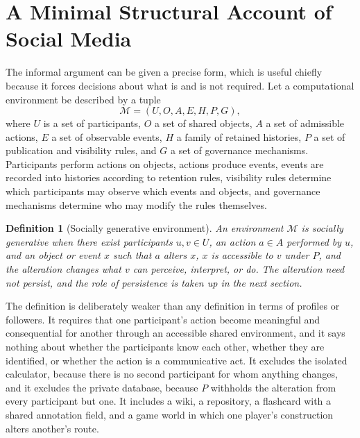 \documentclass[11pt]{article}
\newtheorem{definition}{Definition}
\theoremstyle{remark}
\newcommand{\U}{U}
\newcommand{\Oo}{O}
\newcommand{\A}{A}
\newcommand{\E}{E}
\newcommand{\Hh}{H}
\newcommand{\Pp}{P}
\newcommand{\Gg}{G}
\begin{document}
\section{A Minimal Structural Account of Social Media}
\label{sec:structure}

The informal argument can be given a precise form, which is useful chiefly because it forces decisions about what is and is not required. Let a computational environment be described by a tuple
\[
\mathcal{M}=(\U,\Oo,\A,\E,\Hh,\Pp,\Gg),
\]
where $\U$ is a set of participants, $\Oo$ a set of shared objects, $\A$ a set of admissible actions, $\E$ a set of observable events, $\Hh$ a family of retained histories, $\Pp$ a set of publication and visibility rules, and $\Gg$ a set of governance mechanisms. Participants perform actions on objects, actions produce events, events are recorded into histories according to retention rules, visibility rules determine which participants may observe which events and objects, and governance mechanisms determine who may modify the rules themselves.

\begin{definition}[Socially generative environment]
An environment $\mathcal{M}$ is \emph{socially generative} when there exist participants $u,v\in\U$, an action $a\in\A$ performed by $u$, and an object or event $x$ such that $a$ alters $x$, $x$ is accessible to $v$ under $\Pp$, and the alteration changes what $v$ can perceive, interpret, or do. The alteration need not persist, and the role of persistence is taken up in the next section.
\end{definition}

The definition is deliberately weaker than any definition in terms of profiles or followers. It requires that one participant's action become meaningful and consequential for another through an accessible shared environment, and it says nothing about whether the participants know each other, whether they are identified, or whether the action is a communicative act. It excludes the isolated calculator, because there is no second participant for whom anything changes, and it excludes the private database, because $\Pp$ withholds the alteration from every participant but one. It includes a wiki, a repository, a flashcard with a shared annotation field, and a game world in which one player's construction alters another's route.
\end{document}
